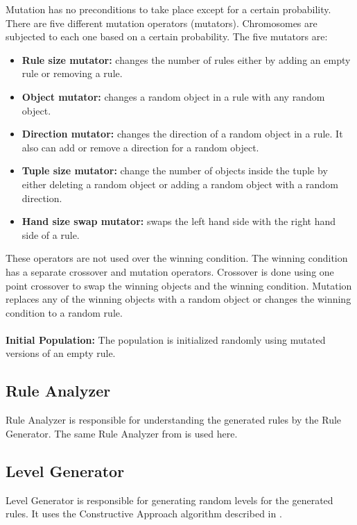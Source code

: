 Mutation has no preconditions to take place except for a certain probability. There are five different mutation operators (mutators). Chromosomes are subjected to each one based on a certain probability. The five mutators are:
\begin{itemize} \itemsep0pt \parskip0pt 
	\item \textbf{Rule size mutator:} changes the number of rules either by adding an empty rule or removing a rule.
	\item \textbf{Object mutator:} changes a random object in a rule with any random object.
	\item \textbf{Direction mutator:} changes the direction of a random object in a rule. It also can add or remove a direction for a random object.
	\item \textbf{Tuple size mutator:} change the number of objects inside the tuple by either deleting a random object or adding a random object with a random direction.
	\item \textbf{Hand size swap mutator:} swaps the left hand side with the right hand side of a rule.
\end{itemize}

These operators are not used over the winning condition. The winning condition has a separate crossover and mutation operators. Crossover is done using one point crossover to swap the winning objects and the winning condition. Mutation replaces any of the winning objects with a random object or changes the winning condition to a random rule.\\\\
\textbf{Initial Population:} The population is initialized randomly using mutated versions of an empty rule.

\subsection{Rule Analyzer}
Rule Analyzer is responsible for understanding the generated rules by the Rule Generator. The same Rule Analyzer from  is used here.

\subsection{Level Generator}
Level Generator is responsible for generating random levels for the generated rules. It uses the Constructive Approach algorithm described in .

